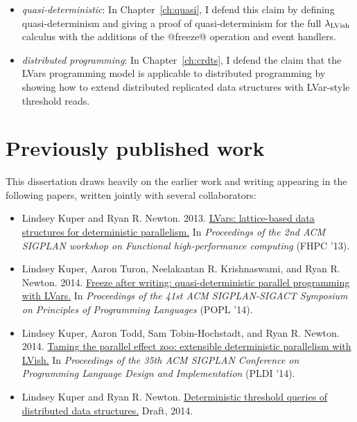 \begin{itemize}
  \item \emph{quasi-deterministic}: In Chapter~\ref{ch:quasi}, I
    defend this claim by defining quasi-determinism and giving a proof
    of quasi-determinism for the full $\lambda_{\textrm{LVish}}$ calculus with the
    additions of the @freeze@ operation and event handlers.

  \item \emph{distributed programming}: In Chapter~\ref{ch:crdts}, I
    defend the claim that the LVars programming model is applicable to
    distributed programming by showing how to extend distributed
    replicated data structures with LVar-style threshold reads.
\end{itemize}

\section{Previously published work}

This dissertation draws heavily on the earlier work and writing
appearing in the following papers, written jointly with several
collaborators:

\begin{itemize}
\item Lindsey Kuper and Ryan
  R. Newton. 2013. \href{http://doi.acm.org/10.1145/2502323.2502326}{LVars:
    lattice-based data structures for deterministic parallelism.} In
  \emph{Proceedings of the 2nd ACM SIGPLAN workshop on Functional
    high-performance computing} (FHPC '13).

\item Lindsey Kuper, Aaron Turon, Neelakantan R. Krishnaswami, and
  Ryan
  R. Newton. 2014. \href{http://doi.acm.org/10.1145/2535838.2535842
  }{Freeze after writing: quasi-deterministic parallel programming
    with LVars.} In \emph{Proceedings of the 41st ACM SIGPLAN-SIGACT
    Symposium on Principles of Programming Languages} (POPL '14).

\item Lindsey Kuper, Aaron Todd, Sam Tobin-Hochstadt, and Ryan
  R. Newton. 2014. \href{http://doi.acm.org/10.1145/2594291.2594312
  }{Taming the parallel effect zoo: extensible deterministic
    parallelism with LVish.} In \emph{Proceedings of the 35th ACM
    SIGPLAN Conference on Programming Language Design and
    Implementation} (PLDI '14).

\item Lindsey Kuper and Ryan
  R. Newton. \href{http://www.cs.indiana.edu/~lkuper/papers/threshold-queries-draft.pdf}{Deterministic
    threshold queries of distributed data structures.} Draft,
  2014.

\end{itemize}

